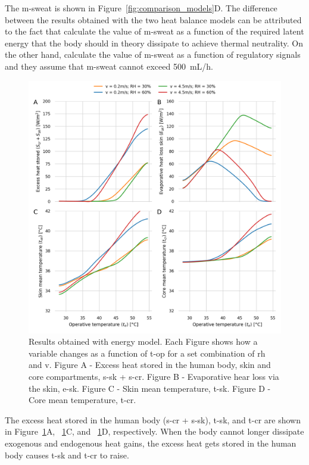 The \acf{m-sweat} is shown in Figure~\ref{fig:comparison_models}D\@.
The difference between the results obtained with the two heat balance models can be attributed to the fact that \citeauthor{Jay2015} calculate the value of \ac{m-sweat} as a function of the required latent energy that the body should in theory dissipate to achieve thermal neutrality.
On the other hand, \citeauthor{GaggeSET} calculate the value of \ac{m-sweat} as a function of regulatory signals and they assume that \ac{m-sweat} cannot exceed 500~mL/h.

\begin{figure}[thb!]
    \centering
    \includegraphics[width=\textwidth]{figures/results_model_2}
    \caption{Results obtained with  energy model.
    Each Figure shows how a variable changes as a function of \ac{t-op} for a set combination of \ac{rh} and \ac{v}.
    Figure A - Excess heat stored in the human body, skin and core compartments, \ac{s-sk} + \ac{s-cr}.
    Figure B - Evaporative hear loss via the skin, \ac{e-sk}.
    Figure C - Skin mean temperature, \ac{t-sk}.
    Figure D - Core mean temperature, \ac{t-cr}.}
    \label{fig:results_model_2}
\end{figure}

The excess heat stored in the human body (\acs{s-cr} + \acs{s-sk}), \ac{t-sk}, and \ac{t-cr} are shown in Figure~\ref{fig:results_model_2}A, ~\ref{fig:results_model_2}C, and ~\ref{fig:results_model_2}D, respectively.
When the body cannot longer dissipate exogenous and endogenous heat gains, the excess heat gets stored in the human body causes \ac{t-sk} and \ac{t-cr} to raise.

